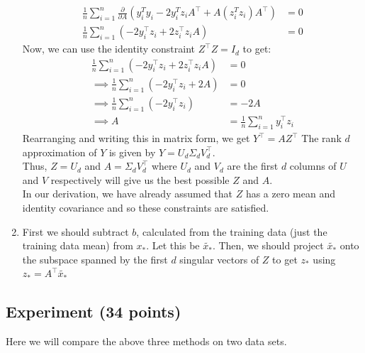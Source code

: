 \documentclass[a4paper]{article}
\theoremstyle{definition}
\begin{document}
\begin{enumerate}
\begin{align*}
        \frac{1}{n} \sum_{i=1}^n \frac{\partial}{\partial A} \left( y_i^Ty_i - 2y_i^Tz_iA^\top + A(z_i^Tz_i)A^\top \right) &= 0 \\
        \frac{1}{n} \sum_{i=1}^n \left(-2 y_i^\top z_i + 2z_i^\top z_iA\right) &= 0
    \end{align*}
    Now, we can use the identity constraint $Z^\top Z = I_d$ to get:
    \begin{align*}
        \frac{1}{n} \sum_{i=1}^n \left(-2 y_i^\top z_i + 2z_i^\top z_iA\right) &= 0\\
        \implies \frac{1}{n} \sum_{i=1}^n \left(-2 y_i^\top z_i + 2A\right) &= 0\\
        \implies \frac{1}{n} \sum_{i=1}^n \left(-2 y_i^\top z_i\right) &= -2A\\
        \implies A &= \frac{1}{n} \sum_{i=1}^n y_i^\top z_i
    \end{align*}
    Rearranging and writing this in matrix form, we get $Y^\top = AZ^\top$
    The rank $d$ approximation of $Y$ is given by $Y = U_d\Sigma_d V_d^\top$. \\
    Thus, $Z = U_d$ and $A = \Sigma_dV_d^\top$ where $U_d$ and $V_d$ are the first $d$ columns of $U$ and $V$ respectively will give us the best possible $Z$ and $A$.\\
    In our derivation, we have already assumed that $Z$ has a zero mean and identity covariance and so these constraints are satisfied.\\

    \item First we should subtract $b$, calculated from the training data (just the training data mean) from $x_*$. Let this be $\tilde{x_*}$. Then, we should project $\tilde{x_*}$ onto the subspace spanned by the first $d$ singular vectors of $Z$ to get $z_*$ using $z_* = A^\top \tilde{x_*}$\

\end{enumerate}
\subsection{Experiment (34 points)}

Here we will compare the above three methods on two data sets. 
\end{document}
